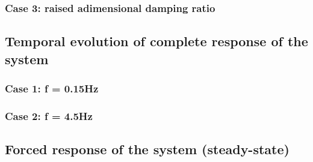 \documentclass[a4paper,12pt,oneside]{article}
\begin{document}
\subsubsection*{Case 3: raised adimensional damping ratio}



\subsection{Temporal evolution of complete response of the system}



\subsubsection*{Case 1: f = 0.15Hz}



\subsubsection*{Case 2: f = 4.5Hz}



\subsection{Forced response of the system (steady-state)}
\end{document}
